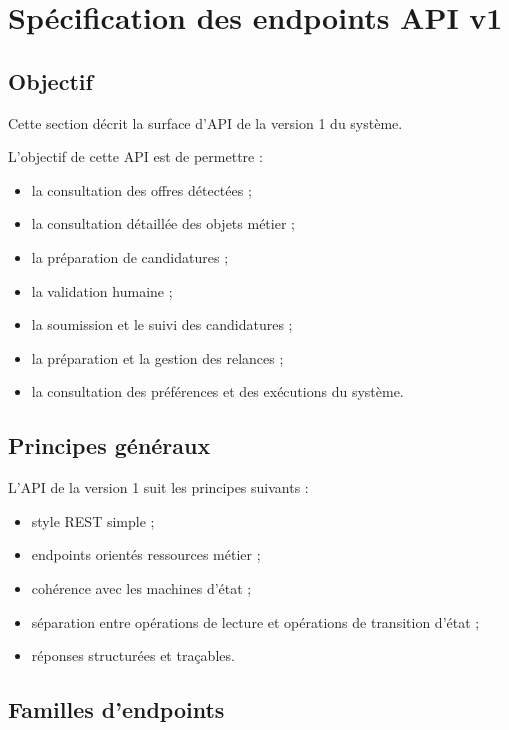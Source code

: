 \documentclass[11pt,a4paper]{article}
\begin{document}
\section{Spécification des endpoints API v1}

\subsection{Objectif}

Cette section décrit la surface d’API de la version 1 du système.

L’objectif de cette API est de permettre :

\begin{itemize}
    \item la consultation des offres détectées ;
    \item la consultation détaillée des objets métier ;
    \item la préparation de candidatures ;
    \item la validation humaine ;
    \item la soumission et le suivi des candidatures ;
    \item la préparation et la gestion des relances ;
    \item la consultation des préférences et des exécutions du système.
\end{itemize}

\subsection{Principes généraux}

L’API de la version 1 suit les principes suivants :

\begin{itemize}
    \item style REST simple ;
    \item endpoints orientés ressources métier ;
    \item cohérence avec les machines d’état ;
    \item séparation entre opérations de lecture et opérations de transition d’état ;
    \item réponses structurées et traçables.
\end{itemize}

\subsection{Familles d’endpoints}
\end{document}
